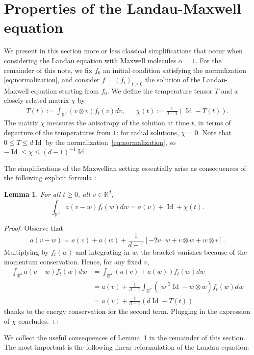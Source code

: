 \documentclass[11pt,a4paper]{article}
\theoremstyle{definition}
\theoremstyle{plain}
\newtheorem{lemma}[defi]{Lemma}
\DeclareMathOperator*{\Id}{Id}
\begin{document}
\section{Properties of the Landau-Maxwell equation}
\label{sec:Properties of the Landau-Maxwell equation}
We present in this section more or less classical simplifications that occur when considering the Landau equation with Maxwell molecules $\alpha=1$. For the remainder of this note, we fix $f_0$ an initial condition satisfying the normalization \eqref{eq:normalization}, and
consider $f=(f_t)_{t\geq 0}$ the solution of the Landau-Maxwell equation starting from $f_0$. We define the temperature tensor $T$ and a closely related matrix $\chi$ by
\begin{align}
    \label{eq:defT}
        T(t) := \int_{\mathbb{R}^{d}} (v\otimes v)f_t(v) dv, &&\chi(t) := \frac{1}{d-1}\left(\Id-T(t)\right).
\end{align}
The matrix $\chi$ measures the anisotropy of the solution at time $t$, in terms of departure of the temperatures from $1$: for radial solutions, $\chi=0$. Note that $0\leq T\leq d\Id$ by the normalization~\eqref{eq:normalization}, so $-\Id \leq \chi \leq (d-1)^{-1} \Id$.

The simplifications of the Maxwellian setting essentially arise as consequences of the following explicit formula \cite{Villani1998b}: 

\begin{lemma}
    \label{lem:formulaA}
     For all $t\geq 0$, all $v\in\mathbb{R}^d$,
    \begin{equation*}
        \int_{\mathbb{R}^{d}} a(v-w) f_t(w)dw = a(v)+\Id + \chi(t).
    \end{equation*}
\end{lemma}
\begin{proof}%
    Observe that
    $$a(v-w)=a(v)+a(w) +\frac{1}{d-1}\left[- 2v\cdot w+v\otimes w + w\otimes v\right].$$
    Multiplying by $f_t(w)$ and integrating in $w$, the bracket vanishes because of the momentum conservation.
    Hence, for any fixed $v$,
    \begin{align*}
        \int_{\mathbb{R}^{d}} a(v-w) f_t(w)dw&=\int_{\mathbb{R}^{d}} \left(a(v)+a(w)\right)f_t(w)dw\\
        &=a(v)+\frac{1}{d-1}\int_{\mathbb{R}^{d}} \left( \vert w\vert^2\Id - w\otimes w\right)f_t(w)dw\\
        &=a(v) +\frac{1}{d-1}\left(d\Id-T(t)\right)
    \end{align*}
    thanks to the energy conservation for the second term. Plugging in the expression of $\chi$ concludes.
\end{proof}
We collect the useful consequences of Lemma~\ref{lem:formulaA} in the remainder of this section. The most important is the following linear reformulation of the Landau equation:
\end{document}
